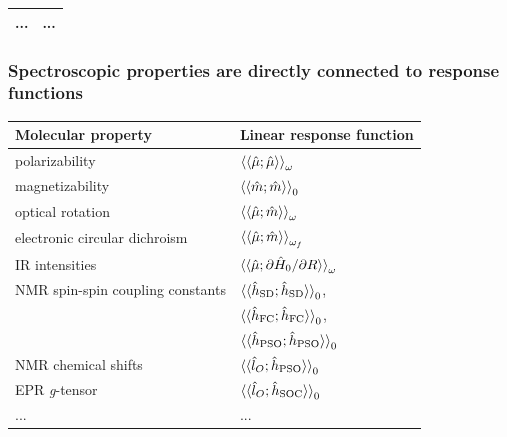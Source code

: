 \documentclass{beamer}
\begin{document}
\begin{frame}
\begin{tabulary}{1.00\textwidth}{rL}
    ... & ... \\
    \bottomrule
  \end{tabulary}
\end{frame}

\begin{frame}
  \frametitle{Spectroscopic properties are directly connected to response functions}
  \centering
  \begin{tabular}{ll}
    \toprule
    \textbf{Molecular property}       & \textbf{Linear response function} \\
    \midrule
    polarizability                    & \( \braket{\braket{\hat{\mu};\hat{\mu}}}_{\omega} \) \\
    magnetizability                   & \( \braket{\braket{\hat{m};\hat{m}}}_{0} \) \\
    optical rotation                  & \( \braket{\braket{\hat{\mu};\hat{m}}}_{\omega} \) \\
    electronic circular dichroism     & \( \braket{\braket{\hat{\mu};\hat{m}}}_{\omega_{f}} \) \\
    IR intensities                    & \( \braket{\braket{\hat{\mu};\partial\hat{H}_{0}/\partial R}}_{\omega} \) \\
    NMR spin-spin coupling constants  & \( \braket{\braket{\hat{h}_{\text{SD}};\hat{h}_{\text{SD}}}}_{0} \), \\
                                      & \( \braket{\braket{\hat{h}_{\text{FC}};\hat{h}_{\text{FC}}}}_{0} \), \\
                                      & \( \braket{\braket{\hat{h}_{\text{PSO}};\hat{h}_{\text{PSO}}}}_{0} \) \\
    NMR chemical shifts               & \( \braket{\braket{\hat{l}_{O};\hat{h}_{\text{PSO}}}}_{0} \) \\
    EPR \textit{g}-tensor             & \( \braket{\braket{\hat{l}_{O};\hat{h}_{\text{SOC}}}}_{0} \) \\
    ... & ... \\
    \bottomrule
  \end{tabular}
\end{frame}
\end{document}
